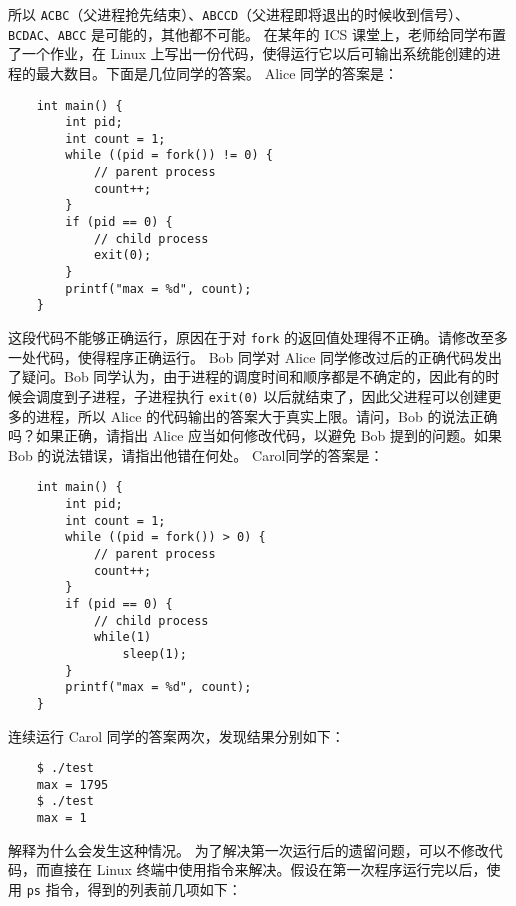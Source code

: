 \begin{problems}
\begin{figure}[H]
        \end{figure}
        所以 \verb|ACBC|（父进程抢先结束）、\verb|ABCCD|（父进程即将退出的时候收到信号）、\verb|BCDAC|、\verb|ABCC| 是可能的，其他都不可能。
        \pro 在某年的 ICS 课堂上，老师给同学布置了一个作业，在 Linux 上写出一份代码，使得运行它以后可输出系统能创建的进程的最大数目。下面是几位同学的答案。
            \qn Alice 同学的答案是：
            \begin{verbatim}
    int main() {
        int pid;
        int count = 1;
        while ((pid = fork()) != 0) {
            // parent process
            count++;
        } 
        if (pid == 0) {
            // child process
            exit(0);
        } 
        printf("max = %d", count);
    }
            \end{verbatim}
            这段代码不能够正确运行，原因在于对 \verb|fork| 的返回值处理得不正确。请修改至多一处代码，使得程序正确运行。
            \qn Bob 同学对 Alice 同学修改过后的正确代码发出了疑问。Bob 同学认为，由于进程的调度时间和顺序都是不确定的，因此有的时候会调度到子进程，子进程执行 \verb|exit(0)| 以后就结束了，因此父进程可以创建更多的进程，所以 Alice 的代码输出的答案大于真实上限。请问，Bob 的说法正确吗？如果正确，请指出 Alice 应当如何修改代码，以避免 Bob 提到的问题。如果 Bob 的说法错误，请指出他错在何处。
            \qn Carol同学的答案是：
            \begin{verbatim}
    int main() {
        int pid;
        int count = 1;
        while ((pid = fork()) > 0) {
            // parent process
            count++;
        } 
        if (pid == 0) {
            // child process
            while(1)
                sleep(1);
        } 
        printf("max = %d", count);
    }
            \end{verbatim}
            连续运行 Carol 同学的答案两次，发现结果分别如下：
            \begin{verbatim}
    $ ./test
    max = 1795
    $ ./test
    max = 1
            \end{verbatim}
                \subqn 解释为什么会发生这种情况。
                \subqn 为了解决第一次运行后的遗留问题，可以不修改代码，而直接在 Linux 终端中使用指令来解决。假设在第一次程序运行完以后，使用 \verb|ps| 指令，得到的列表前几项如下：

\end{problems}
